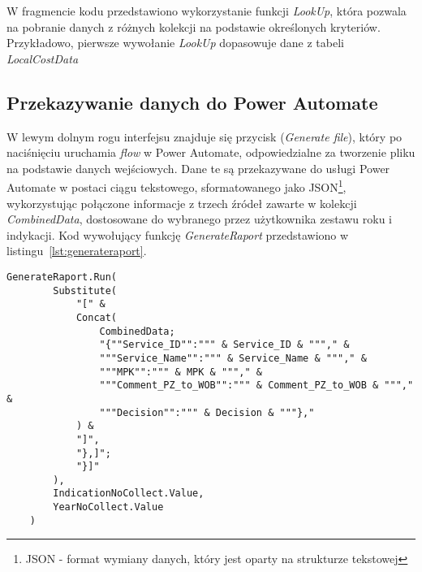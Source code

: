 W fragmencie kodu przedstawiono wykorzystanie funkcji \textit{LookUp}, która pozwala na pobranie danych z różnych kolekcji na podstawie określonych kryteriów. Przykładowo, pierwsze wywołanie \textit{LookUp} dopasowuje dane z tabeli \textit{LocalCostData}



\subsection{Przekazywanie danych do Power Automate}

W lewym dolnym rogu interfejsu znajduje się przycisk (\textit{Generate file}), który po naciśnięciu uruchamia \textit{flow} w Power Automate, odpowiedzialne za tworzenie pliku na podstawie danych wejściowych. Dane te są przekazywane do usługi Power Automate w postaci ciągu tekstowego, sformatowanego jako JSON\footnote{JSON - format wymiany danych, który jest oparty na strukturze tekstowej}, wykorzystując połączone informacje z trzech źródeł zawarte w kolekcji \textit{CombinedData}, dostosowane do wybranego przez użytkownika zestawu roku i indykacji. Kod wywołujący funkcję \textit{GenerateRaport} przedstawiono w listingu~\ref{lst:generateraport}.



\begin{lstlisting}[language=PowerFx, caption={Kod wywołujący funkcję GenerateRaport}, label={lst:generateraport}]
    GenerateRaport.Run(
        Substitute(
            "[" & 
            Concat(
                CombinedData;
                "{""Service_ID"":""" & Service_ID & """," &
                """Service_Name"":""" & Service_Name & """," &
                """MPK"":""" & MPK & """," &
                """Comment_PZ_to_WOB"":""" & Comment_PZ_to_WOB & """," &
                """Decision"":""" & Decision & """},"
            ) & 
            "]",
            "},]"; 
            "}]"
        ),
        IndicationNoCollect.Value,
        YearNoCollect.Value
    )
    \end{lstlisting}

